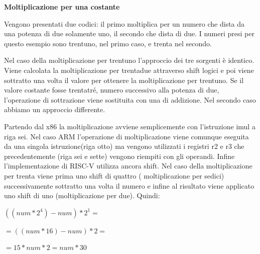 \documentclass[12pt, a4paper]{report}
\begin{document}
\vspace{0.3 cm}

\textbf{Moltiplicazione per una costante}

Vengono presentati due codici: il primo moltiplica per un numero che dista da una potenza di due solamente uno, il secondo che dista di due. I numeri presi per questo esempio sono trentuno, nel primo caso, e trenta nel secondo.

\vspace{0.2 cm }

\begin{figure}[ht]
	\begin{subfigure}[b]{0.4\textwidth}
 
 	
		
 \end{subfigure}
 \hfill
 \begin{subfigure}[b]{0.4\textwidth}
 
 	
		
 \end{subfigure}
 
\end{figure}

\vspace{0.3 cm}
Nel caso della moltiplicazione per trentuno l'approccio dei tre sorgenti è identico. Viene calcolata la moltiplicazione per trentadue attraverso shift logici e poi viene sottratto una volta il valore per ottenere la moltiplicazione per trentuno. Se il valore costante fosse trentatré, numero successivo alla potenza di due, l'operazione di sottrazione viene sostituita con una di addizione. Nel secondo caso abbiamo un approccio differente.

Partendo dal x86 la moltiplicazione avviene semplicemente con l'istruzione imul a riga sei. Nel caso ARM l'operazione di moltiplicazione viene comunque eseguita da una singola istruzione(riga otto) ma vengono utilizzati i registri r2 e r3 che precedentemente (riga sei e sette) vengono riempiti con gli operandi. Infine l'implementazione di RISC-V utilizza ancora shift. Nel caso della moltiplicazione per trenta viene prima uno shift di quattro ( moltiplicazione per sedici) successivamente sottratto una volta il numero e infine al risultato viene applicato uno shift di uno (moltiplicazione per due). Quindi: 
\begin{center}
	\vspace{0.2cm}
$((num * 2^4) - num ) * 2^1 = $ 

$ =((num * 16 ) - num ) * 2 =$ 

$ = 15 * num * 2 = num *30 $ 
\end{center}
\end{document}
